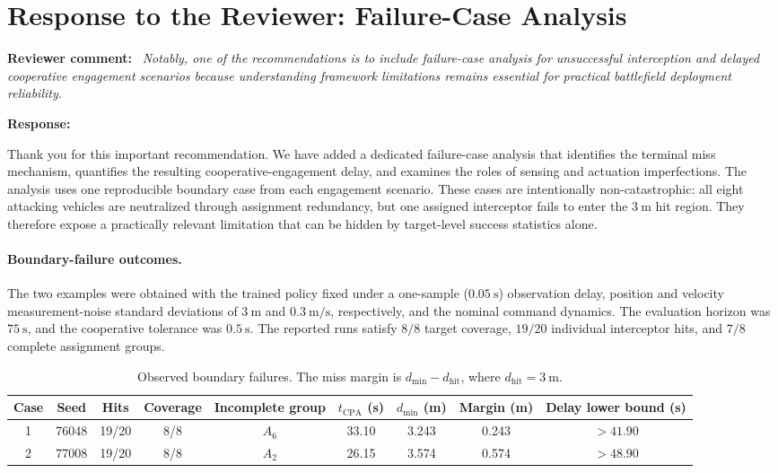 \documentclass[10pt]{article}
\newcommand{\reviewercomment}[1]{%
  \noindent\textbf{\textcolor{reviewerblue}{Reviewer comment:}}%
  \ \textit{#1}\par
}
\newcommand{\authorresponse}{%
  \noindent\textbf{\textcolor{responseblue}{Response:}}\ %
}
\begin{document}
\section*{Response to the Reviewer: Failure-Case Analysis}

\reviewercomment{Notably, one of the recommendations is to include
failure-case analysis for unsuccessful interception and delayed cooperative
engagement scenarios because understanding framework limitations remains
essential for practical battlefield deployment reliability.}

\authorresponse
Thank you for this important recommendation. We have added a dedicated
failure-case analysis that identifies the terminal miss mechanism, quantifies
the resulting cooperative-engagement delay, and examines the roles of sensing
and actuation imperfections. The analysis uses one reproducible boundary case
from each engagement scenario. These cases are intentionally non-catastrophic:
all eight attacking vehicles are neutralized through assignment redundancy,
but one assigned interceptor fails to enter the \(3~\mathrm{m}\) hit region.
They therefore expose a practically relevant limitation that can be hidden by
target-level success statistics alone.

\paragraph{Boundary-failure outcomes.}
The two examples were obtained with the trained policy fixed under a
one-sample (\(0.05~\mathrm{s}\)) observation delay, position and velocity
measurement-noise standard deviations of \(3~\mathrm{m}\) and
\(0.3~\mathrm{m/s}\), respectively, and the nominal command dynamics. The
evaluation horizon was \(75~\mathrm{s}\), and the cooperative tolerance was
\(0.5~\mathrm{s}\). The reported runs satisfy \(8/8\) target coverage,
\(19/20\) individual interceptor hits, and \(7/8\) complete assignment groups.

\begin{table}[H]
  \centering
  \caption{Observed boundary failures. The miss margin is
  \(d_{\min}-d_{\mathrm{hit}}\), where
  \(d_{\mathrm{hit}}=3~\mathrm{m}\).}
  \label{tab:failure_outcomes}
  \small
  \setlength{\tabcolsep}{4.3pt}
  \renewcommand{\arraystretch}{1.12}
  \begin{tabular}{ccccccccc}
    \toprule
    Case & Seed & Hits & Coverage & Incomplete group &
    \(t_{\mathrm{CPA}}\) (s) & \(d_{\min}\) (m) &
    Margin (m) & Delay lower bound (s) \\
    \midrule
    1 & 76048 & 19/20 & 8/8 & \(A_6\) & 33.10 & 3.243 & 0.243 & \(>41.90\) \\
    2 & 77008 & 19/20 & 8/8 & \(A_2\) & 26.15 & 3.574 & 0.574 & \(>48.90\) \\
    \bottomrule
  \end{tabular}
\end{table}
\end{document}
